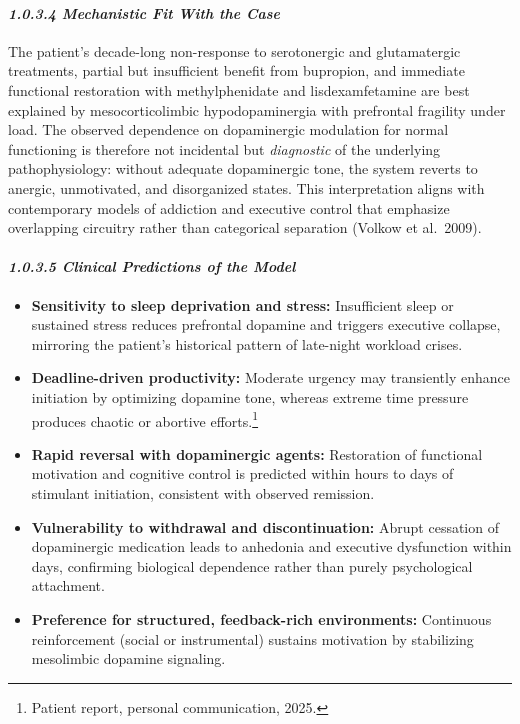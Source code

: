 \paragraph{\texorpdfstring{\emph{1.0.3.4 Mechanistic Fit With the Case}}{1.0.3.4 Mechanistic Fit With the Case}}\label{10b_traad-mechanistic-fit-with-the-case}

The patient's decade-long non-response to serotonergic and glutamatergic treatments, partial but insufficient benefit from bupropion, and immediate functional restoration with methylphenidate and lisdexamfetamine are best explained by mesocorticolimbic hypodopaminergia with prefrontal fragility under load. The observed dependence on dopaminergic modulation for normal functioning is therefore not incidental but \emph{diagnostic} of the underlying pathophysiology: without adequate dopaminergic tone, the system reverts to anergic, unmotivated, and disorganized states. This interpretation aligns with contemporary models of addiction and executive control that emphasize overlapping circuitry rather than categorical separation (Volkow et al.~2009).

\paragraph{\texorpdfstring{\emph{1.0.3.5 Clinical Predictions of the Model}}{1.0.3.5 Clinical Predictions of the Model}}\label{10b_traad-clinical-predictions-of-the-model}

\begin{itemize}
\item
  \textbf{Sensitivity to sleep deprivation and stress:} Insufficient sleep or sustained stress reduces prefrontal dopamine and triggers executive collapse, mirroring the patient's historical pattern of late-night workload crises.
\item
  \textbf{Deadline-driven productivity:} Moderate urgency may transiently enhance initiation by optimizing dopamine tone, whereas extreme time pressure produces chaotic or abortive efforts.\footnote{Patient report, personal communication, 2025.}
\item
  \textbf{Rapid reversal with dopaminergic agents:} Restoration of functional motivation and cognitive control is predicted within hours to days of stimulant initiation, consistent with observed remission.
\item
  \textbf{Vulnerability to withdrawal and discontinuation:} Abrupt cessation of dopaminergic medication leads to anhedonia and executive dysfunction within days, confirming biological dependence rather than purely psychological attachment.
\item
  \textbf{Preference for structured, feedback-rich environments:} Continuous reinforcement (social or instrumental) sustains motivation by stabilizing mesolimbic dopamine signaling.
\end{itemize}

